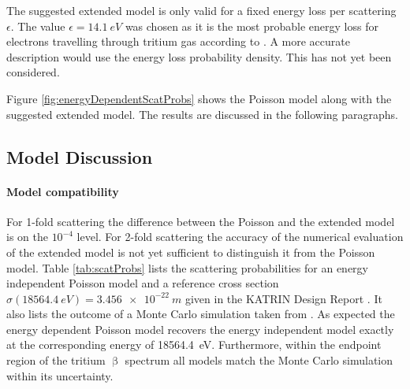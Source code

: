 The suggested extended model is only valid for a fixed energy loss per scattering $\epsilon$. The value $\epsilon=\SI{14.1}{eV}$ was chosen as it is the most probable energy loss for electrons travelling through tritium gas according to \cite{Aseev2000}. A more accurate description would use the energy loss probability density. This has not yet been considered.

Figure \ref{fig:energyDependentScatProbs} shows the Poisson model along with the suggested extended model. The results are discussed in the following paragraphs.

\subsection{Model Discussion}
\paragraph{Model compatibility}
 For 1-fold scattering the difference between the Poisson and the extended model is on the $10^{-4}$ level. For 2-fold scattering the accuracy of the numerical evaluation of the extended model is not yet sufficient to distinguish it from the Poisson model. Table \ref{tab:scatProbs} lists the scattering probabilities for an energy independent Poisson model and a reference cross section $\sigma(\SI{18564.4}{eV})=\SI{3.456e-22}{m}$ given in the KATRIN Design Report \cite{Angrik:2005ep}. It also lists the outcome of a Monte Carlo simulation taken from \cite{Groh2015}. As expected the energy dependent Poisson model recovers the energy independent model exactly at the corresponding energy of \SI{18564.4}{eV}. Furthermore, within the endpoint region of the tritium $\upbeta$ spectrum all models match the Monte Carlo simulation within its uncertainty.

